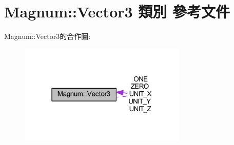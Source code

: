 \hypertarget{class_magnum_1_1_vector3}{}\section{Magnum\+:\+:Vector3 類別 參考文件}
\label{class_magnum_1_1_vector3}


Magnum\+:\+:Vector3的合作圖\+:\nopagebreak
\begin{figure}[H]
\begin{center}
\leavevmode
\includegraphics[width=226pt]{class_magnum_1_1_vector3__coll__graph}
\end{center}
\end{figure}
